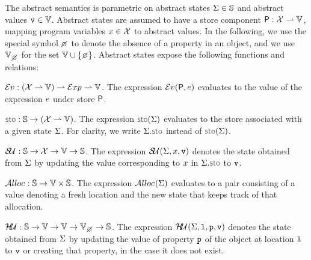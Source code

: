  The abstract semantics is parametric on abstract states $\Sigma \in \mathbb{S}$ and abstract values $\mathtt{v} \in \mathbb{V}$.
Abstract states are assumed to have a store component ${\sf P}: \mathcal{X} \rightharpoonup \mathbb{V}$, mapping program variables $x \in \mathcal{X}$ to abstract values. 
In the following, we use the special symbol $\none$ to denote the absence of a property in an object, and we use $\setext{\absvals}{\none}$ for the set $\absvals \cup \{ \none \}$.
Abstract states expose the following functions and relations: 
\begin{description}
\setlength{\itemsep}{0.2em}
  \item[\jsil Expression Evaluation,] $\mathcal{E}v_{} :  (\mathcal{X} \rightharpoonup \mathbb{V})  \rightharpoonup \mathcal{E}xp \rightharpoonup \mathbb{V}$. 
  	The expression $\mathcal{E}v_{}({\sf P}, e)$ evaluates to the value of the \jsil expression $e$ under store ${\sf P}$. 

  \item[Store Selector,] $\stosel : \absstates \rightarrow (\jvars \partialmap \absvals)$. The expression $\stosel(\absstate)$ evaluates to the store associated with a given  state $\Sigma$. For clarity, we write $\absstate.\stosel$ instead of $\stosel(\absstate)$. 

  \item[Store Update,] $\mathcal{S\!U}_{}: \mathbb{S} \rightarrow \mathcal{X} \rightarrow \mathbb{V} \rightarrow \mathbb{S}$. 
             The expression $\mathcal{S\!U}_{}(\Sigma, x, \mathtt{v})$ denotes the state obtained from $\Sigma$ 
             by updating the value corresponding to $x$ in $\absstate.\stosel$ to $\mathtt{v}$. 

  \item[Heap Allocation,] $\mathcal{A}lloc_{}: \mathbb{S} \rightarrow \mathbb{V} \times \mathbb{S}$.   The expression $\mathcal{A}lloc_{}(\Sigma)$ evaluates to a pair consisting
          of a value denoting a fresh location and the new state that keeps track of that allocation. %
%             


   \item[Heap Update,] $\hpupdt{} : \absstates \rightarrow \absvals \rightarrow \absvals \rightarrow \setext{\absvals}{\none} \rightarrow \absstates$. 
             The expression $\mathcal{H\!U}_{}(\Sigma, \mathtt{l}, \mathtt{p}, \mathtt{v})$ denotes the state obtained from $\Sigma$ 
             by updating the value of property $\mathtt{p}$ of the object at location $\mathtt{l}$ to $\mathtt{v}$ or creating that property, in the
             case it does not exist.


\end{description}
